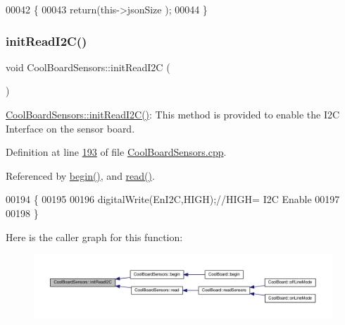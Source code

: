 \begin{DoxyCode}
00042 \{
00043     \textcolor{keywordflow}{return}(this->jsonSize );
00044 \}
\end{DoxyCode}
\mbox{\label{class_cool_board_sensors_acad6a8418c66d36868caca23c844ecb6}} 
\subsubsection{\texorpdfstring{init\+Read\+I2\+C()}{initReadI2C()}}
{\footnotesize\ttfamily void Cool\+Board\+Sensors\+::init\+Read\+I2C (\begin{DoxyParamCaption}{ }\end{DoxyParamCaption})}

\hyperlink{class_cool_board_sensors_acad6a8418c66d36868caca23c844ecb6}{Cool\+Board\+Sensors\+::init\+Read\+I2\+C()}\+: This method is provided to enable the I2C Interface on the sensor board. 

Definition at line \hyperlink{_cool_board_sensors_8cpp_source_l00193}{193} of file \hyperlink{_cool_board_sensors_8cpp_source}{Cool\+Board\+Sensors.\+cpp}.



Referenced by \hyperlink{_cool_board_sensors_8cpp_source_l00085}{begin()}, and \hyperlink{_cool_board_sensors_8cpp_source_l00123}{read()}.


\begin{DoxyCode}
00194 \{
00195   
00196     digitalWrite(EnI2C,HIGH);\textcolor{comment}{//HIGH= I2C Enable}
00197 
00198 \}
\end{DoxyCode}
Here is the caller graph for this function\+:
\nopagebreak
\begin{figure}[H]
\begin{center}
\leavevmode
\includegraphics[width=350pt]{class_cool_board_sensors_acad6a8418c66d36868caca23c844ecb6_icgraph}
\end{center}
\end{figure}
\mbox{\label{class_cool_board_sensors_af6fd79505815b204c178617ecf54c873}} 
